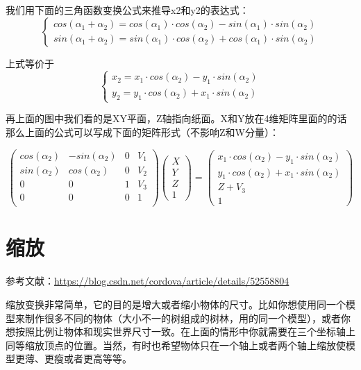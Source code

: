 \documentclass[UTF8,a4paper,12pt]{ctexbook}
\begin{document}
		我们用下面的三角函数变换公式来推导x2和y2的表达式：
		$$
			\begin{cases}
				cos(\alpha_1 + \alpha_2) = cos(\alpha_1)\cdot cos(\alpha_2) - sin(\alpha_1)\cdot sin(\alpha_2)\\
				sin(\alpha_1 + \alpha_2) = sin(\alpha_1)\cdot cos(\alpha_2) + cos(\alpha_1)\cdot sin(\alpha_2)
			\end{cases}
		$$
		
		上式等价于
		$$
		\begin{cases}
			x_2 = x_1\cdot cos(\alpha_2) - y_1\cdot sin(\alpha_2)\\
			y_2 = y_1\cdot cos(\alpha_2) + x_1\cdot sin(\alpha_2)
		\end{cases}
		$$
		
		
		再上面的图中我们看的是XY平面，Z轴指向纸面。X和Y放在4维矩阵里面的的话那么上面的公式可以写成下面的矩阵形式（不影响Z和W分量）：
		
		\begin{equation}
		\left(
		\begin{array}{cccc}
		cos(\alpha_2) & -sin(\alpha_2) & 0& V_1\\
		
		sin(\alpha_2) & cos(\alpha_2) & 0& V_2\\
		
		0 & 0 & 1& V_3\\
		
		0 & 0 & 0& 1\\
		\end{array}
		\right)
		\left(
		\begin{array}{c}
		X\\ 
		Y\\
		Z\\
		1 
		\end{array}	
		\right) 
		=
		\left(
		\begin{array}{c}
		x_1\cdot cos(\alpha_2) - y_1\cdot sin(\alpha_2)\\ 
		y_1\cdot cos(\alpha_2) + x_1\cdot sin(\alpha_2)\\
		Z+V_3\\
		1 
		\end{array}	
		\right)
		\end{equation}
	\section{缩放}
		参考文献：\url{https://blog.csdn.net/cordova/article/details/52558804}

		缩放变换非常简单，它的目的是增大或者缩小物体的尺寸。比如你想使用同一个模型来制作很多不同的物体（大小不一的树组成的树林，用的同一个模型），或者你想按照比例让物体和现实世界尺寸一致。在上面的情形中你就需要在三个坐标轴上同等缩放顶点的位置。当然，有时也希望物体只在一个轴上或者两个轴上缩放使模型更薄、更瘦或者更高等等。
		
\end{document}
